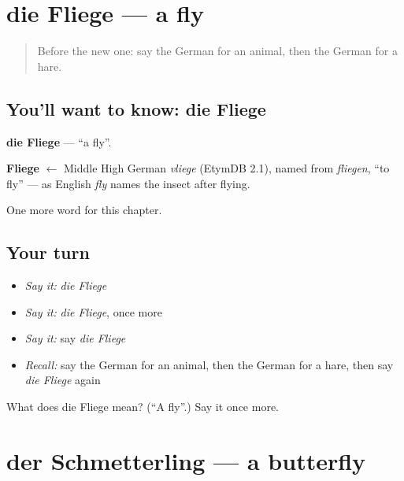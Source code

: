 \section[die Fliege]{die Fliege — a fly}

\label{lesson:GE-C198-fliege}



\begin{quote}
Before the new one: say the German for an animal, then the German for a hare.
\end{quote}

\subsection*{You'll want to know: die Fliege}
\textbf{die Fliege} — \textquotedblleft{}a fly\textquotedblright{}.

\begin{cousinweb}
\textbf{Fliege} $\leftarrow$ Middle High German \emph{vliege} (EtymDB 2.1), named from \emph{fliegen}, \textquotedblleft{}to fly\textquotedblright{} — as English \emph{fly} names the insect after flying.
\end{cousinweb}

\begin{grammarlens}[title={What you've built}]
One more word for this chapter.
\end{grammarlens}

\subsection*{Your turn}
\begin{itemize}
\raggedright
  \item \emph{Say it:} \emph{die Fliege}
  \item \emph{Say it:} \emph{die Fliege}, once more
  \item \emph{Say it:} say \emph{die Fliege}
  \item \emph{Recall:} say the German for an animal, then the German for a hare, then say \emph{die Fliege} again
\end{itemize}

\begin{tcolorbox}[breakable,colback=teal!4,colframe=teal!35!black,title={Before you move on}]
What does die Fliege mean? (\textquotedblleft{}A fly\textquotedblright{}.) Say it once more.
\end{tcolorbox}
\section[der Schmetterling]{der Schmetterling — a butterfly}

